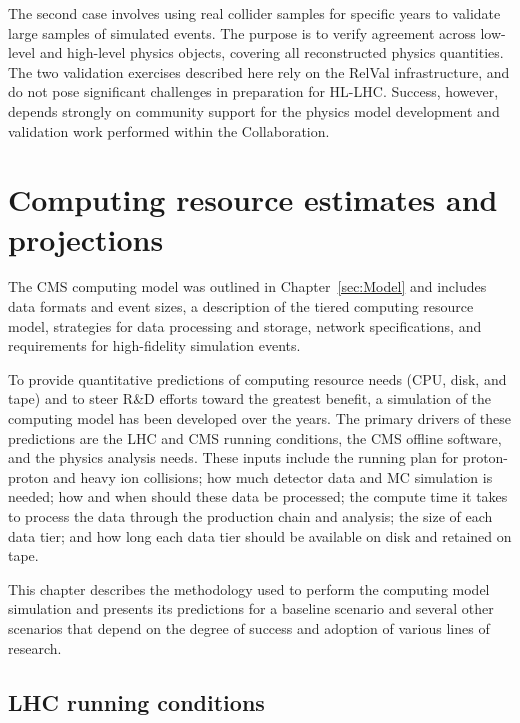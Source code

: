 The second case involves using real collider samples for specific years to validate large samples of simulated events. The purpose is to verify agreement across low-level and high-level physics objects, covering all reconstructed physics quantities. The two validation exercises described here rely on the \gls{RelVal} infrastructure, and do not pose significant challenges in preparation for \gls{HL-LHC}. 
Success, however, depends strongly on community support for the physics model development and validation work performed within the \GEANTfour Collaboration. 


\clearpage

%
%
% 
\section{Computing resource estimates and projections}
\label{sec:EvilPlots}

The CMS computing model was outlined in Chapter~\ref{sec:Model} and includes data formats and event sizes, a description of the tiered computing resource model, strategies for data processing and storage, network specifications, and requirements for high-fidelity simulation events. 

To provide quantitative predictions of computing resource needs (\gls{CPU}, disk, and tape) and to steer R\&D efforts toward the greatest benefit, a simulation of the computing model has been developed over the years. The primary drivers of these predictions are the LHC and CMS running conditions, the CMS offline software, and the physics analysis needs. These inputs include the running plan for proton-proton and heavy ion collisions; how much detector data and \gls{MC} simulation is needed; how and when should these data be processed; the compute time it takes to process the data through the production chain and analysis; the size of each data tier; and how long each data tier should be available on disk and retained on tape.

This chapter describes the methodology used to perform the computing model simulation and presents its predictions for a baseline scenario and several other scenarios that depend on the degree of success and adoption of various lines of research.

\subsection{LHC running conditions}
\label{sec:LPC}

